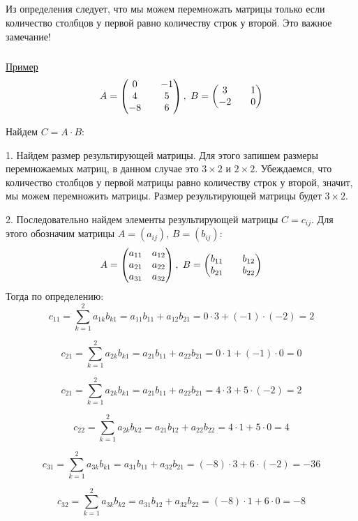 \documentclass[12pt,a4paper]{article}
\begin{document}
\subparagraph{}
Из определения следует, что мы можем перемножать матрицы только если количество столбцов у первой
равно количеству строк у второй. Это важное замечание!

\subparagraph{}
\underline{Пример}
\[ A = \begin{pmatrix}
0 && -1 \\
4 && 5 \\
-8 && 6 \\
\end{pmatrix}, \hspace{3px}
B = \begin{pmatrix}
3 && 1\\
-2 && 0
\end{pmatrix}
\]

Найдем $C = A \cdot B$:

1. Найдем размер результирующей матрицы. Для этого запишем размеры перемножаемых матриц, в данном случае это $3 \times 2$ и $2 \times 2$. Убеждаемся, что количество столбцов у первой матрицы
равно количеству строк у второй, значит, мы можем перемножить матрицы. Размер результирующей матрицы
будет $3 \times 2$.

2. Последовательно найдем элементы результирующей матрицы $C = c_{ij}$. Для этого обозначим матрицы $A = (a_{ij})$, $B = (b_{ij})$:
\[ A = \begin{pmatrix}
a_{11}& a_{12} \\
a_{21}& a_{22} \\
a_{31}& a_{32} 
\end{pmatrix}, \hspace{3px}
B = \begin{pmatrix}
b_{11} && b_{12} \\
b_{21} && b_{22}
\end{pmatrix}
\]
Тогда по определению:
\[c_{11} = \sum_{k=1}^2 a_{1k}b_{k1} = a_{11}b_{11} + a_{12}b_{21} = 0 \cdot 3 + (-1) \cdot (-2) = 2 
\]

\[c_{21} = \sum_{k=1}^2 a_{2k}b_{k1} = a_{21}b_{11} + a_{22}b_{21} = 0 \cdot 1 + (-1) \cdot 0 = 0 
\]

\[c_{21} = \sum_{k=1}^2 a_{2k}b_{k1} = a_{21}b_{11} + a_{22}b_{21} = 4 \cdot 3 + 5 \cdot (-2) = 2 
\]

\[c_{22} = \sum_{k=1}^2 a_{2k}b_{k2} = a_{21}b_{12} + a_{22}b_{22} = 4 \cdot 1 + 5 \cdot 0 = 4 
\]

\[c_{31} = \sum_{k=1}^2 a_{3k}b_{k1} = a_{31}b_{11} + a_{32}b_{21} = (-8) \cdot 3 + 6 \cdot (-2) = -36 
\]

\[c_{32} = \sum_{k=1}^2 a_{3k}b_{k2} = a_{31}b_{12} + a_{32}b_{22} = (-8) \cdot 1 + 6 \cdot 0 = -8 
\]
\end{document}
